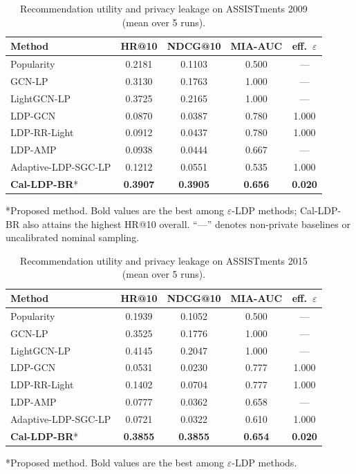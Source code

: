 \documentclass[pdflatex,sn-basic,Numbered]{sn-jnl}
\theoremstyle{plain}
\theoremstyle{remark}
\theoremstyle{definition}
\newcommand{\eps}{\varepsilon}
\begin{document}
\begin{table}[t]
\caption{Recommendation utility and privacy leakage on ASSISTments 2009 (mean over 5 runs).}
\label{tab:main09}
\small
\begin{tabular}{@{}lcccc@{}}
\toprule
Method & HR@10 & NDCG@10 & MIA-AUC & eff.\ $\eps$ \\
\midrule
Popularity & 0.2181 & 0.1103 & 0.500 & --- \\
GCN-LP & 0.3130 & 0.1763 & 1.000 & --- \\
LightGCN-LP & 0.3725 & 0.2165 & 1.000 & --- \\
LDP-GCN & 0.0870 & 0.0387 & 0.780 & 1.000 \\
LDP-RR-Light & 0.0912 & 0.0437 & 0.780 & 1.000 \\
LDP-AMP & 0.0938 & 0.0444 & 0.667 & --- \\
Adaptive-LDP-SGC-LP & 0.1212 & 0.0551 & 0.535 & 1.000 \\
\textbf{Cal-LDP-BR}* & \textbf{0.3907} & \textbf{0.3905} & \textbf{0.656} & \textbf{0.020} \\
\bottomrule
\end{tabular}
\vspace{2pt}\noindent\footnotesize
\footnotesize
*Proposed method. Bold values are the best among $\eps$-LDP methods; Cal-LDP-BR also attains the highest HR@10 overall. ``---'' denotes non-private baselines or uncalibrated nominal sampling.

\end{table}

\begin{table}[t]
\caption{Recommendation utility and privacy leakage on ASSISTments 2015 (mean over 5 runs).}
\label{tab:main15}
\small
\begin{tabular}{@{}lcccc@{}}
\toprule
Method & HR@10 & NDCG@10 & MIA-AUC & eff.\ $\eps$ \\
\midrule
Popularity & 0.1939 & 0.1052 & 0.500 & --- \\
GCN-LP & 0.3525 & 0.1776 & 1.000 & --- \\
LightGCN-LP & 0.4145 & 0.2047 & 1.000 & --- \\
LDP-GCN & 0.0531 & 0.0230 & 0.777 & 1.000 \\
LDP-RR-Light & 0.1402 & 0.0704 & 0.777 & 1.000 \\
LDP-AMP & 0.0777 & 0.0362 & 0.658 & --- \\
Adaptive-LDP-SGC-LP & 0.0721 & 0.0322 & 0.610 & 1.000 \\
\textbf{Cal-LDP-BR}* & \textbf{0.3855} & \textbf{0.3855} & \textbf{0.654} & \textbf{0.020} \\
\bottomrule
\end{tabular}
\vspace{2pt}\noindent\footnotesize
\footnotesize
*Proposed method. Bold values are the best among $\eps$-LDP methods.

\end{table}
\end{document}
